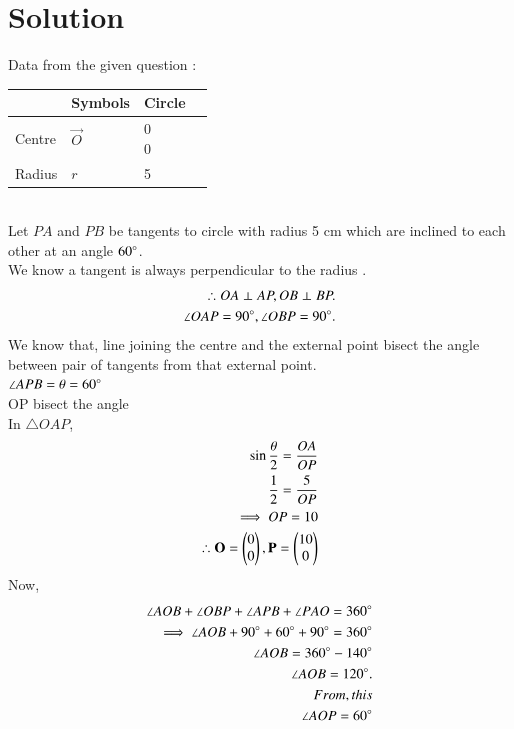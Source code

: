 \documentclass[journal,12pt,twocolumn]{IEEEtran}
\begin{document}
\section{Solution}
Data from the given question :
\begin{table}[!ht]
\begin{center}
\begin{tabular}{ | m{2cm} | m{1.5cm}| m{2cm} | m{1.5cm} |} 
\hline
& Symbols & Circle \\
\hline
Centre & $\vec{O}$ & \myvec{0\\0} \\ 
\hline
Radius & $r$ & 5\\ 
\hline
\end{tabular}
\end{center}
\end{table}
\\
Let $PA$ and $PB$  be tangents  to circle with radius 5 cm  which are inclined to each other at an angle $60\degree$.
\\
We know a tangent is always perpendicular to the radius .
\begin{align}
\therefore OA \perp AP ,  OB \perp BP.
\\
\angle OAP=90\degree, \angle OBP=90\degree.
\end{align}
We know that, line joining the centre and the external point bisect the angle between pair of tangents from that external point.
\\
$\angle APB=\theta =60\degree$
\\
OP bisect the angle \degree
\\
 In  $\triangle OAP$, 
\begin{align}
\sin\frac{\theta}{2}=\frac{OA}{OP}
\\
\frac{1}{2}=\frac{5}{OP}
\\
\implies OP=10
\\
\therefore \mathbf{O}=\begin{pmatrix}0\\0\end{pmatrix} , \mathbf{P}=\begin{pmatrix}10\\0\end{pmatrix}
\end{align}
Now, 
\begin{align}
\angle AOB + \angle OBP + \angle APB + \angle PAO=360\degree
\\
\implies \angle AOB +90\degree + 60\degree +90\degree =360\degree
\\
\angle AOB= 360\degree -140\degree
\\
\angle AOB =120\degree.
\\
From, this
\\
\angle AOP=60\degree
\end{align}
\end{document}
